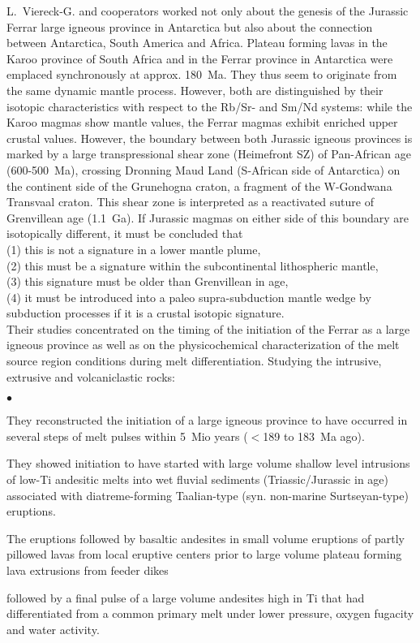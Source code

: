 \documentclass[twoside,10pt]{article}
\newenvironment{dlist}
   {\begin{list}
      {$\bullet$}
      {
      \setlength{\topsep}{0.5ex}
      \setlength{\partopsep}{0.0ex}
      \setlength{\parsep}{0.5ex}
      \setlength{\itemsep}{0.0ex}
      \setlength{\itemindent}{3.0ex}
      \setlength{\leftmargin}{0.0ex}
      \setlength{\labelsep}{1.0ex}
      }
   }
   {\end{list}}
\begin{document}
L.~Viereck-G. and cooperators worked not only about the genesis of the Jurassic Ferrar large igneous province in Antarctica but also about the connection between Antarctica, South America and Africa. 
Plateau forming lavas in the Karoo province of South Africa and in the Ferrar province in Antarctica were emplaced synchronously at approx. 180~Ma. 
They thus seem to originate from the same dynamic mantle process. 
However, both are distinguished by their isotopic characteristics with respect to the Rb/Sr- and Sm/Nd systems: while the Karoo magmas show mantle values, the Ferrar magmas exhibit enriched upper crustal values. 
However, the boundary between both Jurassic ig\-ne\-ous provinces is marked by a large transpressional shear zone (Heimefront SZ) of Pan-African age (600-500~Ma), crossing Dronning Maud Land (S-African side of Antarctica) on the continent side of the Grunehogna craton, a frag\-ment of the W-Gondwana Transvaal craton. 
This shear zone is interpreted as a reactivated suture of Grenvillean age (1.1~Ga). 
If Jurassic magmas on either side of this boundary are isotopically different, it must be concluded that \\
(1) this is not a signature in a lower mantle plume, \\
(2) this must be a signature within the subcontinental lithospheric mantle, \\
(3) this signature must be older than Grenvillean in age, \\
(4) it must be introduced into a paleo supra-subduction mantle wedge by subduction processes if it is a crustal isotopic signature.\\
Their studies concentrated on the timing of the initiation of the Ferrar as a large igneous province as well as on the physicochemical characterization of the melt source region conditions during melt differentiation. 
Studying the intrusive, extrusive and volcaniclastic rocks:
\begin{dlist}
 \item They reconstructed the initiation of a large igneous province to have occurred in several steps of melt pulses within 5~Mio years ($<$189 to 183~Ma ago).
 \item They showed initiation to have started with large volume shallow level intrusions of low-Ti andesitic melts into wet fluvial sediments (Triassic/Jurassic in age) associated with diatreme-forming Taalian-type (syn. non-marine Surtseyan-type) eruptions.
 \item The eruptions followed by basaltic andesites in small volume eruptions of partly pillowed lavas from local eruptive centers prior to large volume plateau forming lava extrusions from feeder dikes
 \item followed by a final pulse of a large volume andesites high in Ti that had differentiated from a common primary melt under lower pressure, oxygen fugacity and water activity.
\end{dlist}
\end{document}
